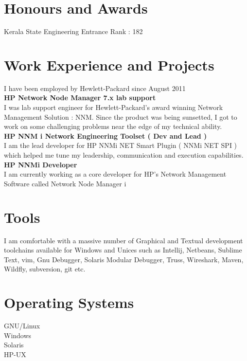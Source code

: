 \documentclass[line,margin]{res}
\begin{document}
\begin{resume}
\section{Honours and Awards}
Kerala State Engineering Entrance Rank : 182\\

\section{Work Experience and Projects}

I have been employed by Hewlett-Packard since August 2011\\

{\bf HP Network Node Manager 7.x lab support}\\
I was lab support engineer for Hewlett-Packard's award winning Network Management Solution : NNM. Since the product was being sunsetted, I got to work on some challenging problems near the edge of my technical ability.\\

{\bf HP NNM i Network Engineering Toolset ( Dev and Lead )}\\
I am the lead developer for HP NNMi NET Smart Plugin ( NNMi NET SPI ) which helped me tune my leadership, communication and execution capabilities.\\

{\bf HP NNMi Developer}\\
I am currently working as a core developer for HP's Network Management Software called Network Node Manager i\\

\section{Tools}
I am comfortable with a massive number of Graphical and Textual development toolchains available for Windows and Unices such as Intellij, Netbeans, Sublime Text, vim, Gnu Debugger, Solaris Modular Debugger, Truss, Wireshark, Maven, Wildfly, subversion, git etc.\\

\section{Operating Systems}
GNU/Linux\\
Windows\\
Solaris\\
HP-UX\\


\end{resume}
\end{document}
